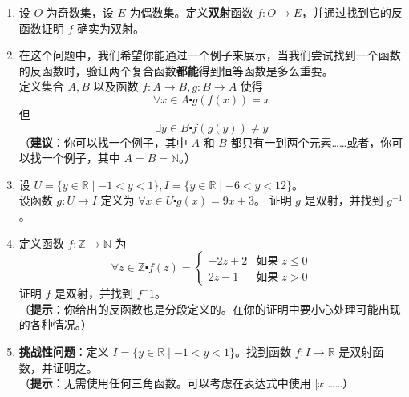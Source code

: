 \begin{enumerate}[label=(\arabic*)]
    \item 设 $O$ 为奇数集，设 $E$ 为偶数集。定义\textbf{双射}函数 $f : O \to E$，并通过找到它的反函数证明 $f$ 确实为双射。
    \item 在这个问题中，我们希望你能通过一个例子来展示，当我们尝试找到一个函数的反函数时，验证两个复合函数\textbf{都能}得到恒等函数是多么重要。\\
    定义集合 $A, B$ 以及函数 $f : A \to B, g : B \to A$ 使得
    \[\forall x \in A \centerdot g(f(x)) = x\]
    但
    \[\exists y \in B \centerdot f(g(y)) \ne y\]
    （\textbf{建议}：你可以找一个例子，其中 $A$ 和 $B$ 都只有一到两个元素……或者，你可以找一个例子，其中 $A=B=\mathbb{N}$。）
    \item 设 $U = \{y \in \mathbb{R} \mid -1 < y < 1\}, I = \{y \in \mathbb{R} \mid -6 < y < 12\}$。\\
        设函数 $g : U \to I$ 定义为 $\forall x \in U \centerdot g(x) = 9x + 3$。
        证明 $g$ 是双射，并找到 $g^{-1}$。
    \item 定义函数 $f : \mathbb{Z} \to \mathbb{N}$ 为
    \[\forall z \in \mathbb{Z} \centerdot f(z) = \begin{cases}
        -2z + 2 & \text{如果}\; z \le 0 \\
        2z-1 & \text{如果}\; z > 0
    \end{cases}\]
    证明 $f$ 是双射，并找到 $f^-1$。\\
    （\textbf{提示}：你给出的反函数也是分段定义的。在你的证明中要小心处理可能出现的各种情况。）
    \item \textbf{挑战性问题}：定义 $I = \{y \in \mathbb{R} \mid -1 < y < 1\}$。找到函数 $f : I \to \mathbb{R}$ 是双射函数，并证明之。\\
    （\textbf{提示}：无需使用任何三角函数。可以考虑在表达式中使用 $|x|$……）
\end{enumerate}